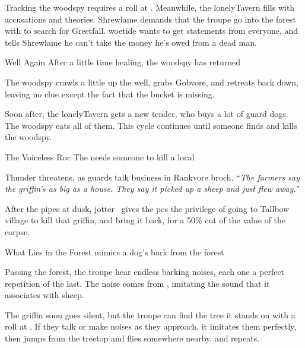 \documentclass[10pt,twoside]{book}
\begin{document}
Tracking the \gls{woodspy} requires a  roll at \tn[10].
Meanwhile, the \gls{lonelyTavern} fills with accusations and theories.
Shrewlame demands that the troupe go into the forest with  to search for Greetfall.
\Gls{woetide} wants to get statements from everyone, and tells Shrewlame he can't take the money he's owed from a dead man.

{Well Again}%
{After a little time healing, the \gls{woodspy} has returned}%

The \gls{woodspy} crawls a little up the well, grabs Gobvore, and retreats back down, leaving no clue except the fact that the bucket is missing.

\setcounter{wounds}{3}
\woodspy
\setcounter{wounds}{0}

Soon after, the \gls{lonelyTavern} gets a new \gls{tender}, who buys a lot of guard dogs.
The \gls{woodspy} eats all of them.
This cycle continues until someone finds and kills the \gls{woodspy}.


{The Voiceless Roc}%
{The  needs someone to kill a local }%

Thunder threatens, as \glspl{guard} talk business in Rankvore \gls{broch}.
``\textit{The farmers say the \gls{griffin}'s as big as a house.
They say it picked up a sheep and just flew away.''}

After the pipes at dusk, \gls{jotter} \composeHumanName\ gives the \glspl{pc} the privilege of going to Tallbow \gls{village} to kill that \gls{griffin}, and bring it back, for a 50\% cut of the value of the corpse.

{What Lies in the Forest}%
{ mimics a dog's bark from the forest}%

Passing the forest, the troupe hear endless barking noises, each one a perfect repetition of the last.
The noise comes from , imitating the sound that it associates with sheep.

The \gls{griffin} soon goes silent, but the troupe can find the tree it stands on with a  roll at \tn[8].
If they talk or make noises as they approach, it imitates them perfectly, then jumps from the treetop and flies somewhere nearby, and repeats.

\begin{figure}[t]
\end{figure}%
\end{document}
